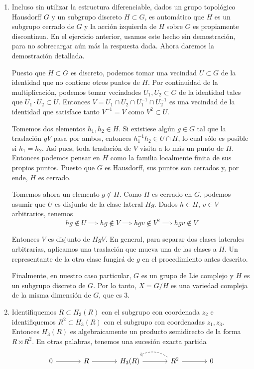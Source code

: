 \begin{solution}
\leavevmode
\begin{enumerate}[label=\alph*)]
    \item Incluso sin utilizar la estructura diferenciable, dados un grupo topológico Hausdorff $G$ y un subgrupo discreto $H \subset G$, es automático que $H$ es un subgrupo cerrado de $G$ y la acción izquierda de $H$ sobre $G$ es propiamente discontinua. En el ejercicio anterior, usamos este hecho sin demostración, para no sobrecargar aún más la respuesta dada. Ahora daremos la demostración detallada.
    
    Puesto que $H \subset G$ es discreto, podemos tomar una vecindad $U \subset G$ de la identidad que no contiene otros puntos de $H$. Por continuidad de la multiplicación, podemos tomar vecindades $U_1, U_2 \subset G$ de la identidad tales que $U_1 \cdot U_2 \subset U$. Entonces $V = U_1 \cap U_2 \cap U_1^{-1} \cap U_2^{-1}$ es una vecindad de la identidad que satisface tanto $V^{-1} = V$ como $V^2 \subset U$.
    
    Tomemos dos elementos $h_1, h_2 \in H$. Si existiese algún $g \in G$ tal que la traslación $gV$ pasa por ambos, entonces $h_1^{-1} h_2 \in U \cap H$, lo cual sólo es posible si $h_1 = h_2$. Así pues, toda traslación de $V$ visita a lo más un punto de $H$. Entonces podemos pensar en $H$ como la familia localmente finita de sus propios puntos. Puesto que $G$ es Hausdorff, sus puntos son cerrados y, por ende, $H$ es cerrado.
    
    Tomemos ahora un elemento $g \notin H$. Como $H$ es cerrado en $G$, podemos asumir que $U$ es disjunto de la clase lateral $Hg$. Dados $h \in H$, $v \in V$ arbitrarios, tenemos
    $$hg \notin U \implies hg \notin V \implies hgv \notin V^2 \implies hgv \notin V$$
    
    Entonces $V$ es disjunto de $HgV$. En general, para separar dos clases laterales arbitrarias, aplicamos una traslación que mueva una de las clases a $H$. Un representante de la otra clase fungirá de $g$ en el procedimiento antes descrito.
    
    Finalmente, en nuestro caso particular, $G$ es un grupo de Lie complejo y $H$ es un subgrupo discreto de $G$. Por lo tanto, $X = G/H$ es una variedad compleja de la misma dimensión de $G$, que es $3$.
    
    \item Identifiquemos $R \subset H_3(R)$ con el subgrupo con coordenada $z_2$ e identifiquemos $R^2 \subset H_3(R)$ con el subgrupo con coordenadas $z_1, z_3$. Entonces $H_3(R)$ es algebraicamente un producto semidirecto de la forma $R \rtimes R^2$. En otras palabras, tenemos una sucesión exacta partida
    $$
    \begin{tikzcd}[row sep=large, column sep=large]
    0 \r & R \r & H_3(R) \r & R^2 \r \arrow[bend right=30, dashed]{l} & 0
    \end{tikzcd}
    $$
    

\end{enumerate}
\end{solution}
